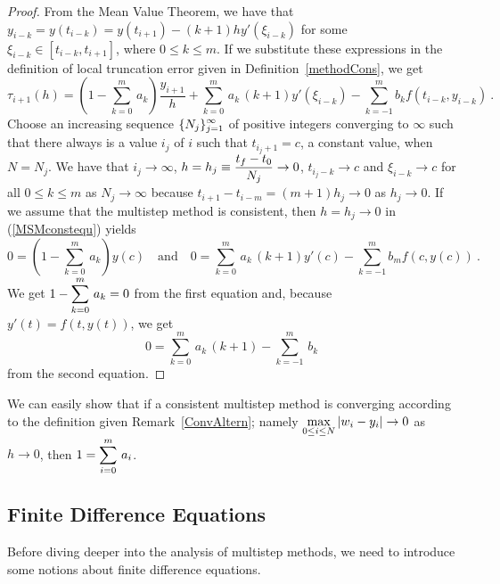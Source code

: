 \begin{proof}
From the Mean Value Theorem, we have that $y_{i-k} = y(t_{i-k}) =
y(t_{i+1}) - (k+1)h y'(\xi_{i-k})$ for some $\xi_{i-k} \in [t_{i-k},t_{i+1}]$,
where $0 \leq k \leq m$.  If we substitute these expressions
in the definition of local truncation error given in
Definition~\ref{methodCons}, we get
\begin{equation}\label{MSMconstequ}
\tau_{i+1}(h) = \left(1-\sum_{k=0}^m\,a_k \right) \frac{y_{i+1}}{h}
+ \sum_{k=0}^m\,a_k\,(k+1)y'(\xi_{i-k})
- \sum_{k=-1}^m b_k f(t_{i-k},y_{i-k}) \ .
\end{equation}
Choose an increasing sequence $\displaystyle \{N_j\}_{j=1}^\infty$ of positive
integers converging to $\infty$ such that there always is a value
$i_j$ of $i$ such that $t_{i_j+1} = c$, a constant value, when $N= N_j$.
We have that $i_j \to \infty$,
$\displaystyle h = h_j \equiv \frac{t_f-t_0}{N_j} \to 0$,
$t_{i_j-k} \rightarrow c$ and $\xi_{i-k} \rightarrow c$ for all
$0 \leq k \leq m$ as $N_j\to \infty$ because
$t_{i+1}-t_{i-m} = (m+1)h_j \to 0$ as $h_j \to 0$.  If we assume that
the multistep method is consistent, then $h = h_j \to 0$ in
(\ref{MSMconstequ}) yields
\[
0 = \left(1-\sum_{k=0}^m\,a_k \right) y(c) \quad
\text{and} \quad
0 = \sum_{k=0}^m\,a_k\,(k+1)y'(c) - \sum_{k=-1}^m b_m f(c,y(c)) \ .
\]
We get $\displaystyle 1-\sum_{k=0}^m\,a_k  = 0$ from the first equation and,
because $y'(t)=f(t,y(t))$, we get
\[
0 = \sum_{k=0}^m\,a_k\,(k+1) - \sum_{k=-1}^m \,b_k
\]
from the second equation.
\end{proof}

\begin{rmk}
We can easily show that if a consistent multistep method is converging
according to the definition given Remark~\ref{ConvAltern}; namely 
$\displaystyle \max_{0\leq i \leq N} |w_i -y_i| \to 0$ as $h \to 0$, then
$\displaystyle 1 = \sum_{i=0}^m\,a_i$.
\end{rmk}

\subsection{Finite Difference Equations}

Before diving deeper into the analysis of multistep methods, we need to
introduce some notions about finite difference equations.

